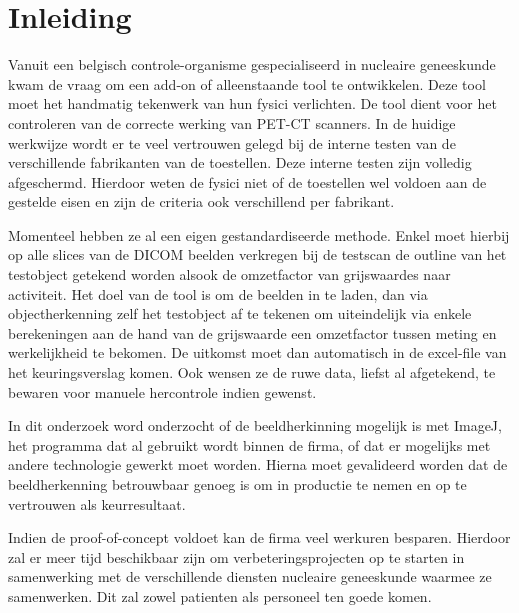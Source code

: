 \documentclass{hogent-article}
\begin{document}

\section{Inleiding}%
\label{sec:inleiding}


Vanuit een belgisch controle-organisme gespecialiseerd in nucleaire geneeskunde kwam de vraag om een add-on of alleenstaande tool te ontwikkelen. Deze tool moet het handmatig tekenwerk van hun fysici verlichten. De tool dient voor het controleren van de correcte werking van PET-CT scanners. In de huidige werkwijze wordt er te veel vertrouwen gelegd bij de interne testen van de verschillende fabrikanten van de toestellen. Deze interne testen zijn volledig afgeschermd. Hierdoor weten de fysici niet of de toestellen wel voldoen aan de gestelde eisen en zijn de criteria ook verschillend per fabrikant. 

Momenteel hebben ze al een eigen gestandardiseerde methode. Enkel moet hierbij op alle slices van de DICOM beelden verkregen bij de testscan de outline van het testobject getekend worden alsook de omzetfactor van grijswaardes naar activiteit. Het doel van de tool is om de beelden in te laden, dan via objectherkenning zelf het testobject af te tekenen om uiteindelijk via enkele berekeningen aan de hand van de grijswaarde een omzetfactor tussen meting en werkelijkheid te bekomen. De uitkomst moet dan automatisch in de excel-file van het keuringsverslag komen. Ook wensen ze de ruwe data, liefst al afgetekend, te bewaren voor manuele hercontrole indien gewenst. 

In dit onderzoek word onderzocht of de beeldherkinning mogelijk is met ImageJ, het programma dat al gebruikt wordt binnen de firma, of dat er mogelijks met andere technologie gewerkt moet worden. Hierna moet gevalideerd worden dat de beeldherkenning betrouwbaar genoeg is om in productie te nemen en op te vertrouwen als keurresultaat.

Indien de proof-of-concept voldoet kan de firma veel werkuren besparen. Hierdoor zal er meer tijd beschikbaar zijn om verbeteringsprojecten op te starten in samenwerking met de verschillende diensten nucleaire geneeskunde waarmee ze samenwerken. Dit zal zowel patienten als personeel ten goede komen.
\end{document}
